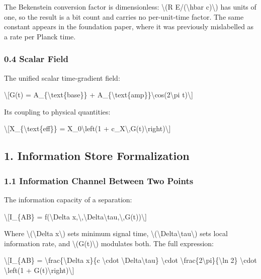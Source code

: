 \documentclass[
  10pt,
]{article}
\begin{document}
The Bekenstein conversion factor is dimensionless: \textbackslash(R
E/(\textbackslash hbar c)\textbackslash) has units of one, so the result
is a bit count and carries no per-unit-time factor. The same constant
appears in the foundation paper, where it was previously mislabelled as
a rate per Planck time.

\hypertarget{scalar-field}{%
\subsubsection{0.4 Scalar Field}\label{scalar-field}}

The unified scalar time-gradient field:

\textbackslash{[}G(t) = A\_\{\textbackslash text\{base\}\} +
A\_\{\textbackslash text\{amp\}\}\textbackslash cos(2\textbackslash pi
t)\textbackslash{]}

Its coupling to physical quantities:

\textbackslash{[}X\_\{\textbackslash text\{eff\}\} =
X\_0\textbackslash left(1 +
c\_X\textbackslash,G(t)\textbackslash right)\textbackslash{]}

\hypertarget{information-store-formalization}{%
\subsection{1. Information Store
Formalization}\label{information-store-formalization}}

\hypertarget{information-channel-between-two-points}{%
\subsubsection{1.1 Information Channel Between Two
Points}\label{information-channel-between-two-points}}

The information capacity of a separation:

\textbackslash{[}I\_\{AB\} = f(\textbackslash Delta
x,\textbackslash,\textbackslash Delta\textbackslash tau,\textbackslash,G(t))\textbackslash{]}

Where \textbackslash(\textbackslash Delta x\textbackslash) sets minimum
signal time,
\textbackslash(\textbackslash Delta\textbackslash tau\textbackslash)
sets local information rate, and \textbackslash(G(t)\textbackslash)
modulates both. The full expression:

\textbackslash{[}I\_\{AB\} = \textbackslash frac\{\textbackslash Delta
x\}\{c \textbackslash cdot \textbackslash Delta\textbackslash tau\}
\textbackslash cdot
\textbackslash frac\{2\textbackslash pi\}\{\textbackslash ln 2\}
\textbackslash cdot \textbackslash left(1 +
G(t)\textbackslash right)\textbackslash{]}
\end{document}
